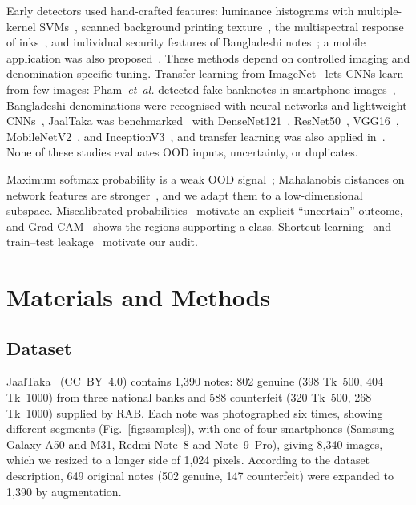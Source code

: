 \documentclass[journal]{IEEEtran}
\begin{document}
Early detectors used hand-crafted features: luminance histograms with multiple-kernel
SVMs~\cite{yeh2011}, scanned background printing texture~\cite{berenguel2016}, the
multispectral response of inks~\cite{baek2018}, and individual security features of
Bangladeshi notes~\cite{uddin2016}; a mobile application was also
proposed~\cite{dittimi2018}. These methods depend on controlled imaging and
denomination-specific tuning. Transfer learning from
ImageNet~\cite{deng2009imagenet,yosinski2014transferable} lets CNNs learn from few
images: Pham~\textit{et~al.} detected fake banknotes in smartphone
images~\cite{pham2020,pham2022}, Bangladeshi denominations were recognised with neural
networks and lightweight CNNs~\cite{jahangir2007,linkon2020}, JaalTaka was
benchmarked~\cite{piyas2025jaaltaka} with DenseNet121~\cite{huang2017densenet},
ResNet50~\cite{he2016resnet}, VGG16~\cite{simonyan2015vgg},
MobileNetV2~\cite{sandler2018mobilenetv2}, and InceptionV3~\cite{szegedy2016inception},
and transfer learning was also applied in~\cite{tabassum2025}. None of these studies
evaluates OOD inputs, uncertainty, or duplicates.

Maximum softmax probability is a weak OOD signal~\cite{hendrycks2017baseline};
Mahalanobis distances on network features are stronger~\cite{lee2018mahalanobis}, and
we adapt them to a low-dimensional subspace. Miscalibrated
probabilities~\cite{guo2017calibration} motivate an explicit ``uncertain'' outcome, and
Grad-CAM~\cite{selvaraju2017gradcam} shows the regions supporting a class. Shortcut
learning~\cite{geirhos2020shortcut} and train--test leakage~\cite{kapoor2023leakage}
motivate our audit.

\section{Materials and Methods}
\label{sec:method}

\subsection{Dataset}
\label{sec:data}

JaalTaka~\cite{piyas2025jaaltaka,jaaltaka_data} (CC~BY~4.0) contains 1{,}390 notes:
802 genuine (398 Tk~500, 404 Tk~1000) from three national banks and 588 counterfeit
(320 Tk~500, 268 Tk~1000) supplied by RAB. Each note was photographed six times, showing
different segments (Fig.~\ref{fig:samples}), with one of four smartphones (Samsung Galaxy
A50 and M31, Redmi Note~8 and Note~9~Pro), giving 8{,}340 images, which we resized to a
longer side of 1{,}024 pixels. According to the dataset description, 649 original notes
(502 genuine, 147 counterfeit) were expanded to 1{,}390 by augmentation.
\end{document}
